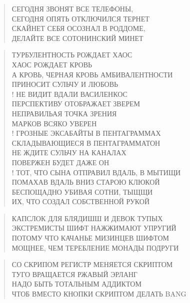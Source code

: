 \poemtitle{***}
\begin{verse}
СЕГОДНЯ ЗВОНЯТ ВСЕ ТЕЛЕФОНЫ, \\
СЕГОДНЯ ОПЯТЬ ОТКЛЮЧИЛСЯ ТЕРНЕТ\\
СКАЙНЕТ СЕБЯ ОСОЗНАЛ В РОДДОМЕ, \\
ДЕЛАЙТЕ ВСЕ СОТОНИНСКИЙ МИНЕТ
\end{verse}

\poemtitle{***}
\begin{verse}
ТУРБУЛЕНТНОСТЬ РОЖДАЕТ ХАОС\\
ХАОС РОЖДАЕТ КРОВЬ\\
А КРОВЬ, ЧЕРНАЯ КРОВЬ АМБИВАЛЕНТНОСТИ\\
ПРИНОСИТ СУЛЬЧУ И ЛЮБОВЬ\\!
НЕ ВИДИТ ВДАЛИ ВАСИЛЕНКОС\\
ПЕРСПЕКТИВУ ОТОБРАЖАЕТ ЗВЕРЕМ\\
НЕПРАВИЛЬАЯ ТОЧКА ЗРЕНИЯ\\
МАРКОВ ВСЯКО УВЕРЕН\\!
ГРОЗНЫЕ ЭКСАБАЙТЫ В ПЕНТАГРАММАХ\\
СКЛАДЫВАЮЩИЕСЯ В ПЕНТАГРАММАТОН\\
НЕ ЖДИТЕ СУЛЬЧУ НА КАНАЛАХ\\
ПОВЕРЖЕН БУДЕТ ДАЖЕ ОН\\!
ТОТ, ЧТО СЫНА ОТПРАВИЛ ВДАЛЬ, В МЫТИЩИ\\
ПОМАХАВ ВДАЛЬ ВНИЗ СТАРОЮ КЛЮКОЙ\\
БЕСПОЩАДНО УБИВАЯ СОТНИ, ТЫЩЩИ\\
ИХ, ЧТО СОЗДАЛ СОБСТВЕННОЙ РУКОЙ
\end{verse}

\poemtitle{***}
\begin{verse}
КАПСЛОК ДЛЯ БЛЯДИШШ И ДЕВОК ТУПЫХ\\
ЭКСТРЕМИСТЫ ШИФТ НАЖЖИМАЮТ УПРУГИЙ\\
ПОТОМУ ЧТО КАЧАНЬЕ МИЗИНЦЕВ ШИФТОМ\\
МОЩНЕЕ, ЧЕМ ТЕРЕБЛЕНИЕ МОНАДЫ ПОДРУГИ
\end{verse}

\poemtitle{***}
\begin{verse}
СО СКРИПОМ РЕГИСТР МЕНЯЕТСЯ СКРИПТОМ\\
ТУГО ВРАЩАЕТСЯ РЖАВЫЙ ЭРЛАНГ\\
НАДО БЫТЬ ТОТАЛЬНЫМ АДДИКТОМ\\
ЧТОБ ВМЕСТО КНОПКИ СКРИПТОМ ДЕЛАТЬ BANG
\end{verse}

